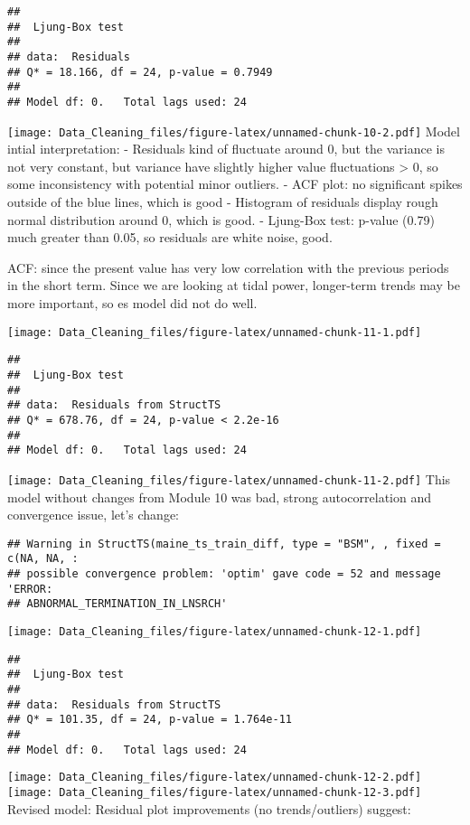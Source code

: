 \documentclass[
]{article}
\begin{document}
\begin{verbatim}
## 
##  Ljung-Box test
## 
## data:  Residuals
## Q* = 18.166, df = 24, p-value = 0.7949
## 
## Model df: 0.   Total lags used: 24
\end{verbatim}

\texttt{[image: Data\_Cleaning\_files/figure-latex/unnamed-chunk-10-2.pdf]}
Model intial interpretation: - Residuals kind of fluctuate around 0, but
the variance is not very constant, but variance have slightly higher
value fluctuations \textgreater{} 0, so some inconsistency with
potential minor outliers. - ACF plot: no significant spikes outside of
the blue lines, which is good - Histogram of residuals display rough
normal distribution around 0, which is good. - Ljung-Box test: p-value
(0.79) much greater than 0.05, so residuals are white noise, good.

ACF: since the present value has very low correlation with the previous
periods in the short term. Since we are looking at tidal power,
longer-term trends may be more important, so es model did not do well.

\texttt{[image: Data\_Cleaning\_files/figure-latex/unnamed-chunk-11-1.pdf]}

\begin{verbatim}
## 
##  Ljung-Box test
## 
## data:  Residuals from StructTS
## Q* = 678.76, df = 24, p-value < 2.2e-16
## 
## Model df: 0.   Total lags used: 24
\end{verbatim}

\texttt{[image: Data\_Cleaning\_files/figure-latex/unnamed-chunk-11-2.pdf]}
This model without changes from Module 10 was bad, strong
autocorrelation and convergence issue, let's change:

\begin{verbatim}
## Warning in StructTS(maine_ts_train_diff, type = "BSM", , fixed = c(NA, NA, :
## possible convergence problem: 'optim' gave code = 52 and message 'ERROR:
## ABNORMAL_TERMINATION_IN_LNSRCH'
\end{verbatim}

\texttt{[image: Data\_Cleaning\_files/figure-latex/unnamed-chunk-12-1.pdf]}

\begin{verbatim}
## 
##  Ljung-Box test
## 
## data:  Residuals from StructTS
## Q* = 101.35, df = 24, p-value = 1.764e-11
## 
## Model df: 0.   Total lags used: 24
\end{verbatim}

\texttt{[image: Data\_Cleaning\_files/figure-latex/unnamed-chunk-12-2.pdf]}
\texttt{[image: Data\_Cleaning\_files/figure-latex/unnamed-chunk-12-3.pdf]}
Revised model: Residual plot improvements (no trends/outliers) suggest:
\end{document}
